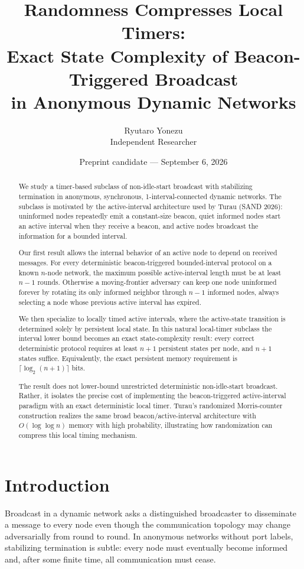 \documentclass[11pt]{article}
\title{Randomness Compresses Local Timers:\\Exact State Complexity of Beacon-Triggered Broadcast\\in Anonymous Dynamic Networks}
\author{Ryutaro Yonezu\\Independent Researcher}
\date{Preprint candidate --- September 6, 2026}
\begin{document}
\maketitle

\begin{abstract}
We study a timer-based subclass of non-idle-start broadcast with stabilizing termination in anonymous, synchronous, 1-interval-connected dynamic networks. The subclass is motivated by the active-interval architecture used by Turau (SAND 2026): uninformed nodes repeatedly emit a constant-size beacon, quiet informed nodes start an active interval when they receive a beacon, and active nodes broadcast the information for a bounded interval.

Our first result allows the internal behavior of an active node to depend on received messages. For every deterministic beacon-triggered bounded-interval protocol on a known $n$-node network, the maximum possible active-interval length must be at least $n-1$ rounds. Otherwise a moving-frontier adversary can keep one node uninformed forever by rotating its only informed neighbor through $n-1$ informed nodes, always selecting a node whose previous active interval has expired.

We then specialize to locally timed active intervals, where the active-state transition is determined solely by persistent local state. In this natural local-timer subclass the interval lower bound becomes an exact state-complexity result: every correct deterministic protocol requires at least $n+1$ persistent states per node, and $n+1$ states suffice. Equivalently, the exact persistent memory requirement is $\lceil\log_2(n+1)\rceil$ bits.

The result does not lower-bound unrestricted deterministic non-idle-start broadcast. Rather, it isolates the precise cost of implementing the beacon-triggered active-interval paradigm with an exact deterministic local timer. Turau's randomized Morris-counter construction realizes the same broad beacon/active-interval architecture with $O(\log\log n)$ memory with high probability, illustrating how randomization can compress this local timing mechanism.
\end{abstract}

\section{Introduction}
Broadcast in a dynamic network asks a distinguished broadcaster to disseminate a message to every node even though the communication topology may change adversarially from round to round. In anonymous networks without port labels, stabilizing termination is subtle: every node must eventually become informed and, after some finite time, all communication must cease.
\end{document}
